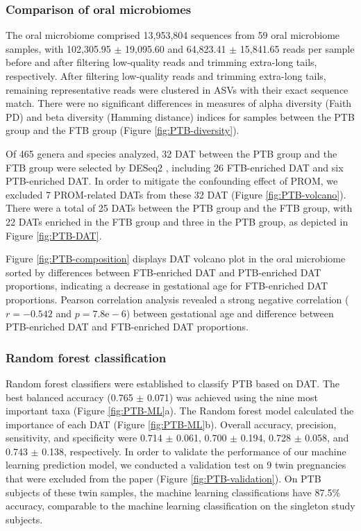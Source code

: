 \documentclass[11pt, a4paper, onecolumn, oneside]{report}
\begin{document}
            \subsubsection{Comparison of oral microbiomes}
                The oral microbiome comprised 13,953,804 sequences from 59 oral microbiome samples, with 102,305.95 $\pm$ 19,095.60 and 64,823.41 $\pm$ 15,841.65 reads per sample before and after filtering low-quality reads and trimming extra-long tails, respectively. After filtering low-quality reads and trimming extra-long tails, remaining representative reads were clustered in ASVs with their exact sequence match. There were no significant differences in measures of alpha diversity (Faith PD) and beta diversity (Hamming distance) indices for samples between the PTB group and the FTB group (Figure \ref{fig:PTB-diversity}).

                Of 465 genera and species analyzed, 32 DAT between the PTB group and the FTB group were selected by DESeq2 \cite{DESeq2-1}, including 26 FTB-enriched DAT and six PTB-enriched DAT. In order to mitigate the confounding effect of PROM, we excluded 7 PROM-related DATs from these 32 DAT (Figure \ref{fig:PTB-volcano}). There were a total of 25 DATs between the PTB group and the FTB group, with 22 DATs enriched in the FTB group and three in the PTB group, as depicted in Figure \ref{fig:PTB-DAT}.

                Figure \ref{fig:PTB-composition} displays DAT volcano plot in the oral microbiome sorted by differences between FTB-enriched DAT and PTB-enriched DAT proportions, indicating a decrease in gestational age for FTB-enriched DAT proportions. Pearson correlation analysis revealed a strong negative correlation ($r = -0.542$ and $p = 7.8\textrm{e}-6$) between gestational age and difference between PTB-enriched DAT and FTB-enriched DAT proportions.

            \subsubsection{Random forest classification}
                Random forest classifiers were established to classify PTB based on DAT. The best balanced accuracy (0.765 $\pm$ 0.071) was achieved using the nine most important taxa (Figure \ref{fig:PTB-ML}a). The Random forest model calculated the importance of each DAT (Figure \ref{fig:PTB-ML}b). Overall accuracy, precision, sensitivity, and specificity were 0.714 $\pm$ 0.061, 0.700 $\pm$ 0.194, 0.728 $\pm$ 0.058, and 0.743 $\pm$ 0.138, respectively. In order to validate the performance of our machine learning prediction model, we conducted a validation test on 9 twin pregnancies that were excluded from the paper (Figure \ref{fig:PTB-validation}). On PTB subjects of these twin samples, the machine learning classifications have 87.5\% accuracy, comparable to the machine learning classification on the singleton study subjects.
\end{document}
